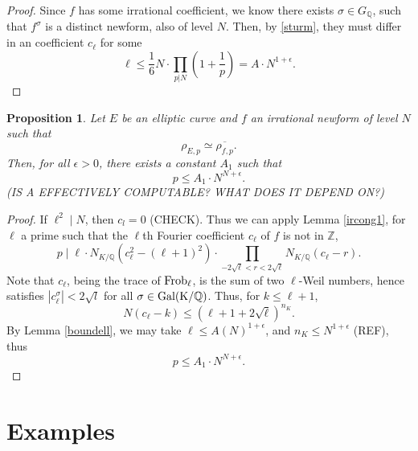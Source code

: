 \documentclass[12pt]{amsart}
\newtheorem{prop}[thm]{Proposition}
\theoremstyle{definition}
\def\Q{{\mathbb Q}}
\def\Z{{\mathbb Z}}
\newcommand{\Frob}{\rm Frob}
\renewcommand{\bar}{\overline}
\newcommand{\Gal}{\rm Gal}
\begin{document}
\begin{proof}
Since $f$ has some irrational coefficient, we know there exists $\sigma \in G_\Q$, such that $f^{\sigma}$ is a distinct newform, also of level $N$.  Then, by \ref{sturm}, they must differ in an coefficient $c_\ell$ for some 
\[ \ell \leq \frac{1}{6} N \cdot \prod_{p|N} \left(1 + \frac{1}{p} \right) = A \cdot N^{1+\epsilon}. \]
\end{proof}

\begin{prop}\label{irboundp}
Let $E$ be an elliptic curve and $f$ an irrational newform of level $N$ such that 
\[\rho_{E,p} \simeq \bar{\rho_{f,p}}.\]
Then, for all $\epsilon > 0$, there exists a constant $A_1$ such that
\[ p \leq  A_1 \cdot N^{N+\epsilon}. \]
(IS A EFFECTIVELY COMPUTABLE? WHAT DOES IT DEPEND ON?)
\end{prop}
\begin{proof}
If $\ell^2 \mid N$, then $c_l = 0$ (CHECK). Thus we can apply Lemma \ref{ircong1}, for $\ell$ a prime such that the $\ell$th Fourier coefficient $c_\ell$ of $f$ is not in $\Z$, 
\[ p \mid \ell \cdot N_{K / \mathbb{Q}}(c_\ell^2-(\ell+1)^2) \cdot \prod_{-2\sqrt{\ell} < r < 2\sqrt{\ell}}{N_{K / \mathbb{Q}}}(c_\ell - r).\]
Note that $c_\ell$, being the trace of $\Frob_\ell$, is the sum of two $\ell$-Weil numbers, hence satisfies $|c_\ell^{\sigma}| < 2\sqrt{l}$ for all $\sigma \in \Gal(K/\Q)$. Thus, for $k \leq \ell+1$, \[N(c_\ell - k) \leq (\ell+1 + 2\sqrt{\ell})^{n_{K}}.\] 
By Lemma \ref{boundell}, we may take $\ell \leq A \left( N \right)^{1+\epsilon}$, and $n_{K} \leq N^{1+\epsilon}$ (REF), thus
\[ p \leq A_1 \cdot N^{N+\epsilon}. \]
\end{proof}
 

\section{Examples}



















{}

\end{document}
